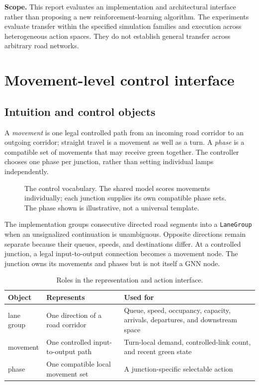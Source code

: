 \documentclass[10pt,a4paper]{article}
\newcommand{\LaneGroup}{\texttt{LaneGroup}}
\newcommand{\reportcontentwidth}{0.82\linewidth}
\begin{document}
\textbf{Scope.}
This report evaluates an implementation and architectural interface rather than proposing a new reinforcement-learning algorithm.
The experiments evaluate transfer within the specified simulation families and execution across heterogeneous action spaces.
They do not establish general transfer across arbitrary road networks.

\section{Movement-level control interface}

\subsection{Intuition and control objects}

A \emph{movement} is one legal controlled path from an incoming road corridor to an outgoing corridor; straight travel is a movement as well as a turn.
A \emph{phase} is a compatible set of movements that may receive green together.
The controller chooses one phase per junction, rather than setting individual lamps independently.

\begin{figure}[H]
  \centering
  \resizebox{0.73\linewidth}{!}{}
  \caption{The control vocabulary. The shared model scores movements individually; each junction supplies its own compatible phase sets. The phase shown is illustrative, not a universal template.}
  \label{fig:concepts}
\end{figure}
\FloatBarrier

The implementation groups consecutive directed road segments into a \LaneGroup{} when an unsignalized continuation is unambiguous.
Opposite directions remain separate because their queues, speeds, and destinations differ.
At a controlled junction, a legal input-to-output connection becomes a movement node.
The junction owns its movements and phases but is not itself a GNN node.

\begin{table}[H]
  \small
  \centering
  \caption{Roles in the representation and action interface.}
  \begin{tabularx}{\reportcontentwidth}{@{}lXX@{}}
    \toprule
    Object & Represents & Used for\\
    \midrule
    lane group & One direction of a road corridor & Queue, speed, occupancy, capacity, arrivals, departures, and downstream space\\
    movement & One controlled input-to-output path & Turn-local demand, controlled-link count, and recent green state\\
    phase & One compatible local movement set & A junction-specific selectable action\\
    \bottomrule
  \end{tabularx}
  \label{tab:terminology}
\end{table}
\end{document}
